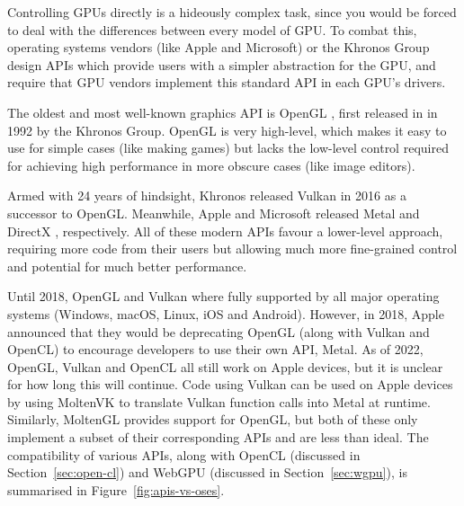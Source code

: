\documentclass[12pt]{article}
\begin{document}
Controlling GPUs directly is a hideously complex task, since you would be forced to deal with the
differences between every model of GPU.  To combat this, operating systems vendors (like Apple and
Microsoft) or the Khronos Group \cite{khronos} design APIs which provide users with a simpler
abstraction for the GPU, and require that GPU vendors implement this standard API in each GPU's
drivers.

The oldest and most well-known graphics API is OpenGL \cite{opengl}, first
released in in 1992 by the Khronos Group.  OpenGL is very high-level, which makes it easy to use for
simple cases (like making games) but lacks the low-level control required for achieving high
performance in more obscure cases (like image editors).

Armed with 24 years of hindsight, Khronos released Vulkan \cite{vulkan} in 2016 as a successor to
OpenGL.  Meanwhile, Apple and Microsoft released Metal \cite{metal} and DirectX \cite{directx},
respectively.  All of these modern APIs favour a lower-level approach, requiring more code from
their users but allowing much more fine-grained control and potential for much better performance.  

Until 2018, OpenGL and Vulkan where fully supported by all major operating systems (Windows, macOS,
Linux, iOS and Android).  However, in 2018, Apple announced that they would be deprecating OpenGL
(along with Vulkan and OpenCL) to encourage developers to use their own API, Metal.  As of 2022,
OpenGL, Vulkan and OpenCL all still work on Apple devices, but it is unclear for how long this will
continue.  Code using Vulkan can be used on Apple devices by using MoltenVK \cite{moltenvk} to
translate Vulkan function calls into Metal at runtime.  Similarly, MoltenGL \cite{moltengl} provides
support for OpenGL, but both of these only implement a subset of their corresponding APIs and are
less than ideal.  The compatibility of various APIs, along with OpenCL (discussed in
Section~\ref{sec:open-cl}) and WebGPU (discussed in Section~\ref{sec:wgpu}), is summarised in
Figure~\ref{fig:apis-vs-oses}.
\end{document}
